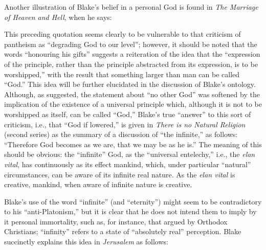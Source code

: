 Another illustration of Blake's belief in a personal God is found in \emph{The Marriage of Heaven and Hell},\supercite{keynes:william-blake}
when he says:


This preceding quotation seems clearly to be vulnerable to that criticism of pantheism as \enquote{degrading
God to our level}; however, it should be noted that the words \enquote{honouring his
gifts} suggests a reiteration of the idea that the \enquote{expression of the principle, rather than
the principle abstracted from its expression, is to be worshipped,} with the result that
something larger than man can be called \enquote{God.} This idea will be further elucidated in the discussion
of Blake's ontology. Although, as suggested, the statement about \enquote{no other God} was softened by the implication
of the existence of a universal principle which, although it is not to be worshipped as itself, can be called \enquote{God,} Blake's
true \enquote{answer} to this sort of criticism, i.e., that \enquote{God if lowered,} is given in \emph{There is no Natural Religion} (second series)\supercite{keynes:william-blake}
as the summary of a discussion of \enquote{the infinite,} as follows: \enquote{Therefore God becomes as we are, that we may be as he is.} The meaning of this
should be obvious: the \enquote{infinite} God, as the \enquote{universal entelechy,} i.e., the \emph{elan vital}, has continuously
as its effect mankind, which, under particular \enquote{natural} circumstances, can be aware of its infinite real nature. As the \emph{elan vital}
is creative, mankind, when aware of infinite nature is creative.

\label{self:16}

Blake's use of the word \enquote{infinite} (and \enquote{eternity}) might seem to be contradictory to his \enquote{anti-Platonism,} but it is clear
that he does not intend them to imply by it personal immortality, such as, for instance, that argued
by Orthodox Christians; \enquote{infinity} refers to a state of \enquote{absolutely real} perception. Blake succinctly explains
this idea in \emph{Jerusalem}\supercite{kazin:portable-blake}
as follows:


